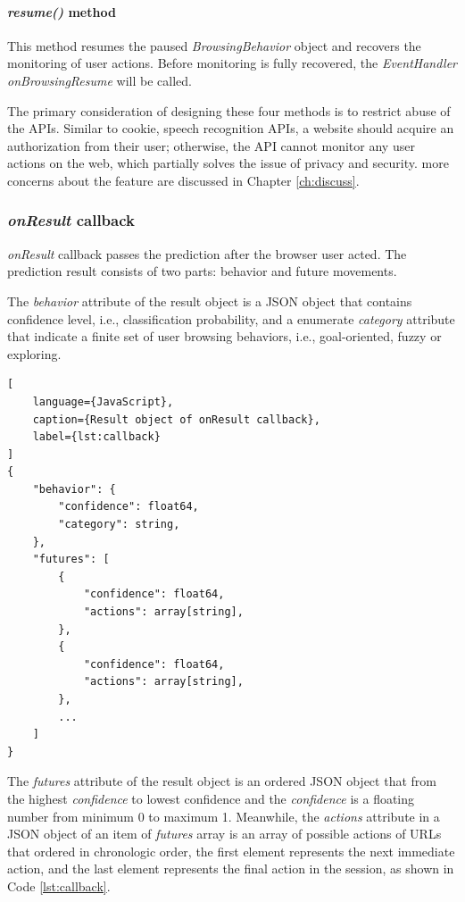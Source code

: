 \paragraph{\emph{resume()} method} This method resumes the paused \emph{BrowsingBehavior}
object and recovers the monitoring of user actions. Before monitoring is fully recovered,
the \emph{EventHandler onBrowsingResume} will be called.

The primary consideration of designing these four methods is to restrict abuse of the APIs.
Similar to cookie, speech recognition APIs, a website should acquire an authorization from
their user; otherwise, the API cannot monitor any user actions on the web, which partially
solves the issue of privacy and security. more concerns about the feature are discussed in
Chapter \ref{ch:discuss}.

\subsubsection{\emph{onResult} callback}

\emph{onResult} callback passes the prediction after the browser user acted.
The prediction result consists of two parts: behavior and future movements.

The \emph{behavior} attribute of the result object is a JSON object that contains 
confidence level, i.e., classification probability, and a enumerate \emph{category} attribute
that indicate a finite set of user browsing behaviors, i.e., goal-oriented, fuzzy or exploring.

\begin{lstlisting}[
    language={JavaScript},
    caption={Result object of onResult callback},
    label={lst:callback}
]
{
    "behavior": {
        "confidence": float64,
        "category": string,
    },
    "futures": [
        {
            "confidence": float64,
            "actions": array[string],
        },
        {
            "confidence": float64,
            "actions": array[string],
        },
        ...
    ]
}
\end{lstlisting}

The \emph{futures} attribute of the result object is an ordered JSON object that from the
highest \emph{confidence} to lowest {confidence} and the \emph{confidence} is a floating
number from minimum 0 to maximum 1. Meanwhile, the \emph{actions} attribute in a 
JSON object of an item of \emph{futures} array is an array of possible actions of URLs that
ordered in chronologic order, the first element represents the next immediate action,
and the last element represents the final action in the session, as shown in Code \ref{lst:callback}.

